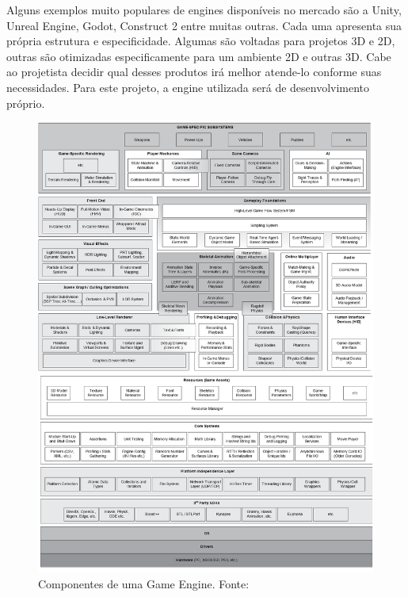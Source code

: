 \documentclass[12pt, 
openright, 
oneside, 
a4paper,    
brazil]{facom-ufu-abntex2}
\begin{document}
Alguns exemplos muito populares de engines disponíveis no mercado são a Unity, Unreal Engine, Godot, Construct 2 entre muitas outras. Cada uma apresenta sua própria estrutura e especificidade. Algumas são voltadas para projetos 3D e 2D, outras são otimizadas especificamente para um ambiente 2D e outras 3D. Cabe ao projetista decidir qual desses produtos irá melhor atende-lo conforme suas necessidades. Para este projeto, a engine utilizada será de desenvolvimento próprio.

\begin{figure}[H]
	\centering
	\includegraphics[width=\textwidth]{imagens/engine_layers.png}
	\caption{Componentes de uma Game Engine. Fonte:~\cite{GameEngineArchitecture}
    \label{fig:arquitetura}}
\end{figure}
\end{document}
